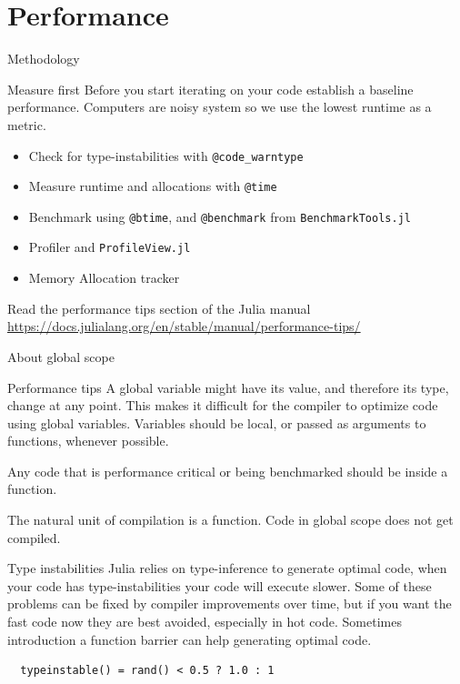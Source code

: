 \documentclass{beamer}
\begin{document}
\section{Performance}
\begin{frame}[fragile]{Methodology}
  \pause
  \begin{block}{Measure first}
    Before you start iterating on your code establish a baseline performance.
    Computers are noisy system so we use the lowest runtime as a metric.
  \end{block}
  \pause
  \begin{itemize}
    \item Check for type-instabilities with \lstinline{@code_warntype}
    \item Measure runtime and allocations with \lstinline{@time}
    \item Benchmark using \lstinline{@btime}, and \lstinline{@benchmark} from \lstinline{BenchmarkTools.jl}
    \item Profiler and \lstinline{ProfileView.jl}
    \item Memory Allocation tracker
  \end{itemize}
  \pause
  Read the performance tips section of the Julia manual \url{https://docs.julialang.org/en/stable/manual/performance-tips/}
\end{frame}
\begin{frame}{About global scope}
  \begin{block}{Performance tips}
    A global variable might have its value, and therefore its type, change at any point. This makes it difficult for the compiler to optimize code using global variables. Variables should be local, or passed as arguments to functions, whenever possible.

    Any code that is performance critical or being benchmarked should be inside a function.
  \end{block}
  \pause
  \begin{block}{}
    The natural unit of compilation is a function. Code in global scope does not get compiled.
  \end{block}
\end{frame}
\begin{frame}[fragile]{Type instabilities}
  Julia relies on type-inference to generate optimal code, when your code has type-instabilities your code will execute slower.
  Some of these problems can be fixed by compiler improvements over time, but if you want the fast code now they are best avoided,
  especially in hot code. Sometimes introduction a function barrier can help generating optimal code.
  \pause
  \begin{lstlisting}
  typeinstable() = rand() < 0.5 ? 1.0 : 1
  \end{lstlisting}
\end{frame}
\end{document}
